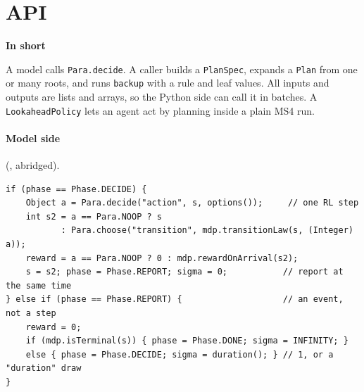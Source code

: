 \documentclass[11pt]{article}
\newcommand{\code}[1]{\texttt{#1}}
\newcommand{\shadedbox}[3]{\par\smallskip\noindent\colorbox{#1}{\parbox{\dimexpr\linewidth-2\fboxsep}{\textbf{#2}\par #3}}\par\smallskip}
\newcommand{\takeaway}[1]{\shadedbox{okbg}{In short}{#1}}
\theoremstyle{plain}
\begin{document}
\section{API}\label{sec:api}

\takeaway{A model calls \code{Para.decide}. A caller builds a \code{PlanSpec}, expands a \code{Plan} from one or many
roots, and runs \code{backup} with a rule and leaf values. All inputs and outputs are lists and arrays, so the Python
side can call it in batches. A \code{LookaheadPolicy} lets an agent act by planning inside a plain MS4 run.}

\paragraph{Model side} (, abridged).
\begin{lstlisting}
if (phase == Phase.DECIDE) {
    Object a = Para.decide("action", s, options());     // one RL step
    int s2 = a == Para.NOOP ? s
           : Para.choose("transition", mdp.transitionLaw(s, (Integer) a));
    reward = a == Para.NOOP ? 0 : mdp.rewardOnArrival(s2);
    s = s2; phase = Phase.REPORT; sigma = 0;           // report at the same time
} else if (phase == Phase.REPORT) {                    // an event, not a step
    reward = 0;
    if (mdp.isTerminal(s)) { phase = Phase.DONE; sigma = INFINITY; }
    else { phase = Phase.DECIDE; sigma = duration(); } // 1, or a "duration" draw
}
\end{lstlisting}
\end{document}
